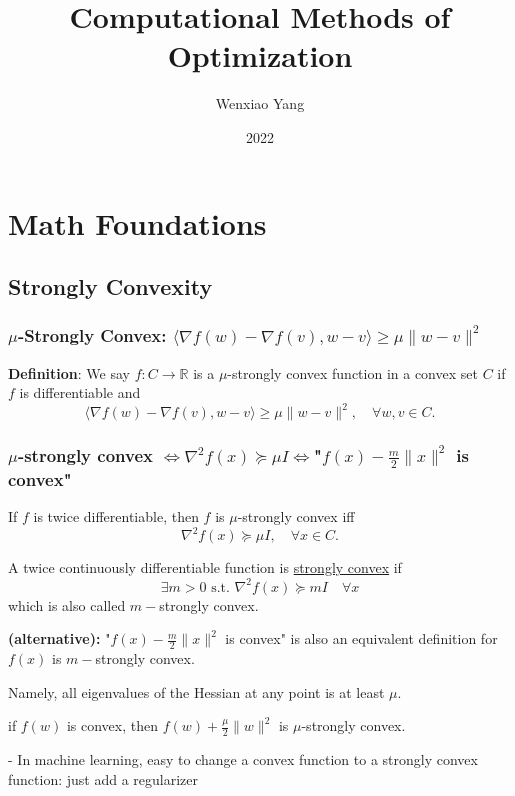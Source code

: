 \documentclass[11pt]{elegantbook}
\title{\textbf{Computational Methods of Optimization}}
\author{Wenxiao Yang}
\institute{Department of Mathematics, University of Illinois at Urbana-Champaign}
\date{2022}
\begin{document}
\maketitle

\frontmatter
\tableofcontents

\mainmatter

\chapter{Math Foundations}
\section{Strongly Convexity}
\subsection{$\mu$-Strongly Convex: $
\langle\nabla f(w)-\nabla f(v), w-v\rangle \geq \mu\|w-v\|^{2}$}
\textbf{Definition}: We say $f: C \rightarrow \mathbb{R}$ is a $\mu$-strongly convex function in a convex set $C$ if $f$ is differentiable and
$$
\langle\nabla f(w)-\nabla f(v), w-v\rangle \geq \mu\|w-v\|^{2}, \quad \forall w, v \in C .
$$
\subsection{$\mu$-strongly convex $\Leftrightarrow \nabla^{2} f(x) \succeq \mu I\Leftrightarrow$"$f(x)-\frac{m}{2}\|x\|^2$ is convex"}
If $f$ is twice differentiable, then $f$ is $\mu$-strongly convex iff
$$
\nabla^{2} f(x) \succeq \mu I, \quad \forall x \in C .
$$
\begin{definition}
    A twice continuously differentiable function is \underline{strongly convex} if $$\exists m>0\text{ s.t. }\nabla^2 f(x)\succeq mI\quad \forall x$$
    which is also called $m-$strongly convex.

    \textbf{(alternative):} "$f(x)-\frac{m}{2}\|x\|^2$ is convex" is also an equivalent definition for $f(x)$ is $m-$strongly convex.
\end{definition}

Namely, all eigenvalues of the Hessian at any point is at least $\mu$.

if $f(w)$ is convex, then $f(w)+\frac{\mu}{2}\|w\|^{2}$ is $\mu$-strongly convex.

- In machine learning, easy to change a convex function to a strongly convex function: just add a regularizer
\end{document}
